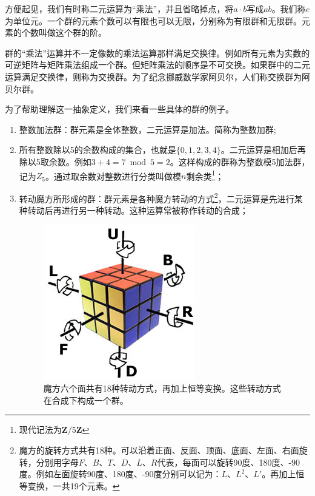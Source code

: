 \documentclass[b5paper]{ctexart}
\begin{document}
方便起见，我们有时称二元运算为“乘法”，并且省略掉点，将$a \cdot b$写成$ab$。我们称$e$为单位元。一个群的元素个数可以有限也可以无限，分别称为有限群和无限群。元素的个数叫做这个群的阶。

群的“乘法”运算并不一定像数的乘法运算那样满足交换律。例如所有元素为实数的可逆矩阵与矩阵乘法组成一个群。但矩阵乘法的顺序是不可交换。如果群中的二元运算满足交换律，则称为交换群。为了纪念挪威数学家阿贝尔，人们称交换群为阿贝尔群。

为了帮助理解这一抽象定义，我们来看一些具体的群的例子。

\begin{enumerate}
\item 整数加法群：群元素是全体整数，二元运算是加法。简称为整数加群;
\item 所有整数除以5的余数构成的集合，也就是$\{0, 1, 2, 3, 4\}$。二元运算是相加后再除以5取余数。例如$3 + 4 = 7 \bmod 5 = 2$。这样构成的群称为整数模5加法群，记为$Z_5$。通过取余数对整数进行分类叫做模$n$剩余类\footnote{现代记法为$\pmb{Z}/5\pmb{Z}$}；
\item 转动魔方所形成的群：群元素是各种魔方转动的方式\footnote{魔方的旋转方式共有18种。可以沿着正面、反面、顶面、底面、左面、右面旋转，分别用字母$F$、$B$、$T$、$D$、$L$、$R$代表，每面可以旋转90度、180度、-90度。例如左面旋转90度、180度、-90度分别可以记为：$L$、$L^2$、$L'$\cite{Wiki-Rubik-Cube-group}。再加上恒等变换，一共19个元素。}，二元运算是先进行某种转动后再进行另一种转动。这种运算常被称作转动的合成；

\begin{figure}[htbp]
 \centering
 \includegraphics[scale=0.6]{img/Rubik_cube_notation.jpg}
 \caption{魔方六个面共有18种转动方式，再加上恒等变换。这些转动方式在合成下构成一个群。}
 \label{fig:Rubik-cube-notation}
\end{figure}


\end{enumerate}
\end{document}
